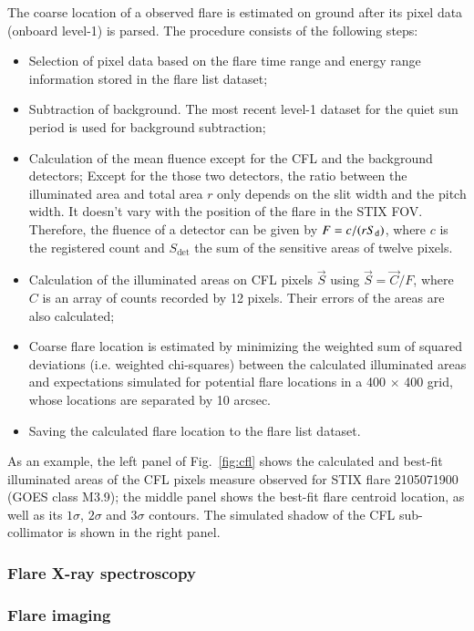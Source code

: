\documentclass[referee]{aa} %
\begin{document}
The coarse location of a  observed flare is estimated on ground after its pixel data (onboard level-1) is parsed.
The procedure consists of the following steps:
\begin{itemize}
  \item Selection of pixel data based on the flare time range and energy range information stored in the flare list dataset;
  \item Subtraction of background. The most recent level-1 dataset for the quiet sun period is used for background subtraction;
  \item Calculation of the mean fluence except for the CFL and the background detectors; 
      Except for the those two detectors, the ratio between the illuminated area and total area $r$ only depends on the 
      slit width and the pitch width. It doesn't vary with the position of the flare in the STIX FOV.  
      Therefore, the fluence of a detector can be given by $F=c/(r S_{\rm d})$,  where $c$ is the registered 
      count and $S_\textrm{det}$ the sum of the sensitive areas of twelve pixels. 
  \item Calculation of the illuminated areas on CFL pixels $\vec{S}$ using $\vec{S} = \vec{C}/F$, where $C$  is an array of counts 
  recorded by 12 pixels. Their errors of the areas are also calculated; 
  \item  Coarse flare location is estimated by minimizing the weighted sum of squared deviations 
  (i.e. weighted chi-squares) between  the calculated illuminated areas and  expectations
  simulated for potential flare locations in a 400 $\times$ 400 grid, whose locations are separated by 10 arcsec.  
  \item Saving the calculated flare location to the flare list dataset. 
\end{itemize}
As an example, the left panel of Fig.~\ref{fig:cfl} shows the calculated and best-fit illuminated areas 
of the CFL pixels measure observed for STIX flare 2105071900 (GOES class M3.9);   the middle panel shows the best-fit 
flare centroid location, as well as its $1\sigma$, $2\sigma$ and $3\sigma$ contours. 
The simulated shadow of the CFL sub-collimator  is shown in the right panel. 
\subsubsection{Flare X-ray spectroscopy}
\subsubsection{Flare imaging}
\end{document}
